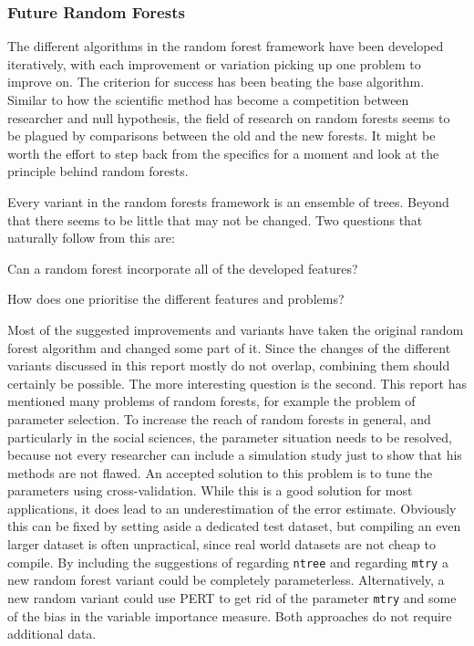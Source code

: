 \documentclass[a4paper,man,12pt,apacite,floatsintext,draftfirst]{apa6} %
\begin{document}
\subsubsection{Future Random Forests}
The different algorithms in the random forest framework have been developed
iteratively, with each improvement or variation picking up one problem to
improve on.
The criterion for success has been beating the base algorithm.
Similar to how the scientific method has become a competition between
researcher and null hypothesis, the field of research on random forests seems
to be plagued by comparisons between the old and the new forests.
It might be worth the effort to step back from the specifics for a moment
and look at the principle behind random forests.

Every variant in the random forests framework is an ensemble of trees.
Beyond that there seems to be little that may not be changed.
Two questions that naturally follow from this are:

\begin{APAenumerate}
\item Can a random forest incorporate all of the developed features?
\item How does one prioritise the different features and problems?
\end{APAenumerate}

Most of the suggested improvements and variants have taken the original
random forest algorithm and changed some part of it. Since the changes of
the different variants discussed in this report mostly do not overlap, combining
them should certainly be possible.
The more interesting question is the second.
This report has mentioned many problems of random forests, for example the
problem of parameter selection.
To increase the reach of random forests in general, and particularly in
the social sciences, the parameter situation needs to be resolved, because
not every researcher can include a simulation study just to show that his
methods are not flawed.
An accepted solution to this problem is to tune the parameters using cross-validation.
While this is a good solution for most applications, it does lead to an
underestimation of the error estimate.
Obviously this can be fixed by setting aside a dedicated test dataset, but
compiling an even larger dataset is often unpractical, since real world datasets
are not cheap to compile.
By including the suggestions of  regarding
\texttt{ntree} and  regarding \texttt{mtry}
a new random forest variant could be completely parameterless.
Alternatively, a new random variant could use PERT to get rid of the
parameter \texttt{mtry} and some of the bias in the variable importance
measure.
Both approaches do not require additional data.
\end{document}
